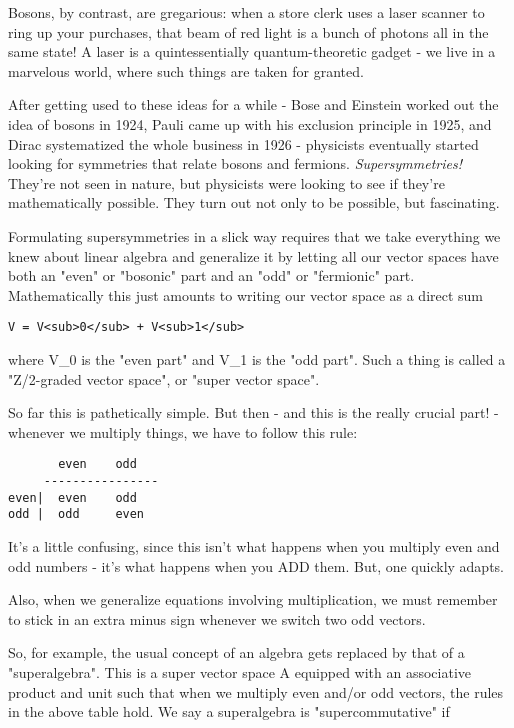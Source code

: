 Bosons, by contrast, are gregarious: when a store clerk uses a laser 
scanner to ring up your purchases, that beam of red light is a bunch of 
photons all in the same state!   A laser is a quintessentially 
quantum-theoretic gadget - we live in a marvelous world, where such things are
taken for granted.

After getting used to these ideas for a while - Bose and Einstein worked 
out the idea of bosons in 1924, Pauli came up with his exclusion principle 
in 1925, and Dirac systematized the whole business in 1926 - physicists
eventually started looking for symmetries that relate bosons and fermions.
\emph{Supersymmetries!}  They're not seen in nature, but physicists 
were looking
to see if they're mathematically possible.  They turn out not only to
be possible, but fascinating.  

Formulating supersymmetries in a slick way requires that we take 
everything we knew about linear algebra and generalize it by letting
all our vector spaces have both an "even" or "bosonic" part and an
"odd" or "fermionic" part.  
Mathematically this just amounts to writing 
our vector space as a direct sum

\begin{verbatim}
V = V<sub>0</sub> + V<sub>1</sub>
\end{verbatim}
    
where V_{0} is the "even part" and V_{1} is 
the "odd part".  Such a thing
is called a "Z/2-graded vector space", 
or "super vector space".  

So far this is pathetically simple.  But then - and this is the really 
crucial part! - whenever we multiply things, we have to follow this rule:

\begin{verbatim}
       even    odd
     ----------------
even|  even    odd
odd |  odd     even
\end{verbatim}
    
It's a little confusing, since this isn't what happens when you
multiply even and odd numbers - it's what happens when you ADD them.  
But, one quickly adapts.  

Also, when we generalize equations involving multiplication, we must 
remember to stick in an extra minus sign whenever we switch two odd 
vectors.  

So, for example, the usual concept of an algebra gets replaced 
by that of a "superalgebra".  This is a super vector space A
equipped with an associative product and unit such that when we
multiply even and/or odd vectors, the rules in the above table hold. 
We say a superalgebra is "supercommutative" if 

